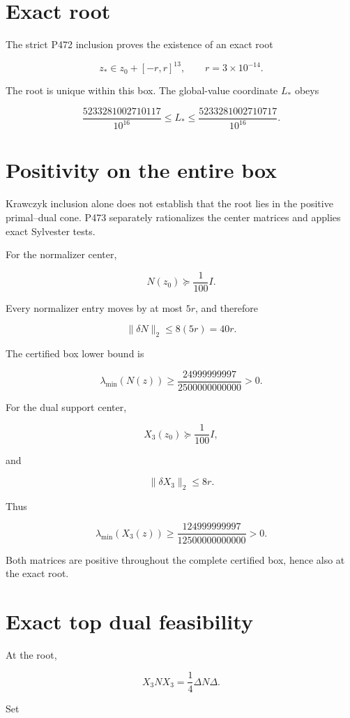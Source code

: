 \documentclass[11pt,a4paper,openany]{report}
\begin{document}
\section{Exact root}

The strict P472 inclusion proves the existence of an exact root

\[
z_*\in z_0+[-r,r]^{13},
\qquad r=3\times10^{-14}.
\]

The root is unique within this box. The global-value coordinate \(L_*\) obeys

\[
\frac{5233281002710117}{10^{16}}
\le L_*\le
\frac{5233281002710717}{10^{16}}.
\]

\section{Positivity on the entire box}

Krawczyk inclusion alone does not establish that the root lies in the positive primal--dual cone. P473 separately rationalizes the center matrices and applies exact Sylvester tests.

For the normalizer center,

\[
N(z_0)\succeq\frac1{100}I.
\]

Every normalizer entry moves by at most \(5r\), and therefore

\[
\|\delta N\|_2\le8(5r)=40r.
\]

The certified box lower bound is

\[
\lambda_{\min}(N(z))
\ge\frac{24999999997}{2500000000000}>0.
\]

For the dual support center,

\[
X_3(z_0)\succeq\frac1{100}I,
\]

and

\[
\|\delta X_3\|_2\le8r.
\]

Thus

\[
\lambda_{\min}(X_3(z))
\ge\frac{124999999997}{12500000000000}>0.
\]

Both matrices are positive throughout the complete certified box, hence also at the exact root.

\section{Exact top dual feasibility}

At the root,

\[
X_3N X_3=\frac14\Delta N\Delta.
\]

Set
\end{document}
